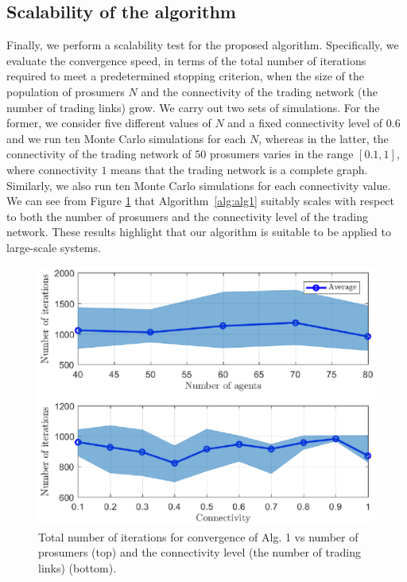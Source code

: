 \documentclass{IEEEtran}  %
\newcommand{\0}{\mathbf{0}}
\newcommand{\1}{\mathbf{1}}
\newcommand{\edit}[1]{\color{blue}{#1}\color{black}}
\newcommand{\note}[1]{\textcolor{blue}{\texttt{#1}}}
\begin{document}
\subsection{Scalability of the algorithm}
Finally, we perform a scalability test for the proposed algorithm. Specifically, we evaluate the convergence speed, in terms of the total number of iterations required to meet a predetermined stopping criterion, when the size of the population of prosumers $N$ and the connectivity of the trading network (the number of trading links) grow. We carry out two sets of simulations.
%
For the former, we consider five different values of $N$ and a fixed connectivity level of $0.6$ and we run ten Monte Carlo simulations for each $N$, whereas in the latter, the connectivity of the trading network of $50$ prosumers varies in the range $[0.1,1]$, where connectivity $1$ means that the trading network is a complete graph. Similarly, we also run ten Monte Carlo simulations for each connectivity value. We can see from Figure \ref{fig:simE} that Algorithm~\ref{alg:alg1} suitably scales with respect to both the number of prosumers and the connectivity level of the trading network. \marginnote{\note{R4-7}} {\edit{The average computational time performed by each prosumer is 74.5 milliseconds per iteration whereas the average computational time/iteration of the DNO is 1.13 seconds on a computer with Intel Xeon E5-2637 3.5 GHz processors and 128 GB of memory.} 
} These results highlight that our algorithm is suitable to be applied to  large-scale systems. 

\begin{figure}[t]
	\centering
	\includegraphics[width=1\linewidth]{figures/simEF1.eps}
	\caption{Total number of iterations for convergence of Alg. 1 vs number of prosumers (top) and the connectivity level (the number of trading links) (bottom).  
	}

	\label{fig:simE}
\end{figure}
\end{document}
